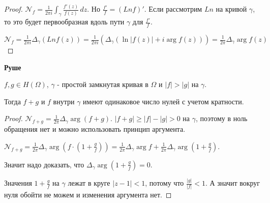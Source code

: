 \begin{proof}
    $\mathcal{N}_f = \frac{1}{2\pi i} \int_{\gamma} \frac{f'(z)}{f(z)} \, dz$. Но $\frac{f'}{f} = (Ln f)'$.
    Если рассмотрим $Ln$ на кривой $\gamma$, то это будет первообразная вдоль пути $\gamma$ для $\frac{f'}{f}$.

    $\mathcal{N}_f = \frac{1}{2\pi i} \Delta_\gamma (Ln f(z)) = \frac{1}{2 \pi i} (\Delta_\gamma
    (\ln |f(z)| + i\arg f(z))) = \frac{1}{2\pi} \Delta_{\gamma} \arg f(z)$
\end{proof}

\begin{theorem}
    \textbf{Руше}

    $f, g \in H(\Omega)$, $\gamma$ - простой замкнутая кривая в $\Omega$ и
    $|f| > |g|$ на $\gamma$.

    Тогда $f + g$ и $f$ внутри $\gamma$ имеют одинаковое число нулей с учетом кратности.
\end{theorem}

\begin{proof}
    $\mathcal{N}_{f + g} = \frac{1}{2 \pi} \Delta_\gamma \arg (f + g)$.
    $|f + g| \geqslant |f| - |g| > 0$ на $\gamma$, поэтому в ноль обращения нет и
    можно использовать принцип аргумента.

    $\mathcal{N}_{f + g} = \frac{1}{2\pi} \Delta_\gamma \arg (f \cdot (1 + \frac{g}{f})) =
    \frac{1}{2\pi} \Delta_\gamma \arg f + \frac{1}{2\pi} \Delta_\gamma \arg (1 + \frac{g}{f})$.

    Значит надо доказать, что $\Delta_\gamma \arg (1 + \frac{g}{f}) = 0$.

    Значения $1 + \frac{g}{f}$ на $\gamma$ лежат в круге $|z - 1| < 1$, потому что $\frac{|g|}{|f|} < 1$. А значит
    вокруг нуля обойти не можем и изменения аргумента нет.
\end{proof}

